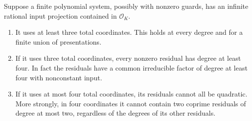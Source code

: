 \begin{theorem}\label{p3sys:small-coordinate-bounds}
Suppose a finite polynomial system, possibly with nonzero guards,
has an infinite rational input projection contained in
$\mathcal O_K$.
\begin{enumerate}
\item It uses at least three total coordinates.  This holds at every
degree and for a finite union of presentations.
\item If it uses three total coordinates, every nonzero residual
has degree at least four.  In fact the residuals have a common
irreducible factor of degree at least four with nonconstant input.
\item If it uses at most four total coordinates, its residuals
cannot all be quadratic.  More strongly, in four coordinates it
cannot contain two coprime residuals of degree at most two,
regardless of the degrees of its other residuals.
\end{enumerate}
\end{theorem}
